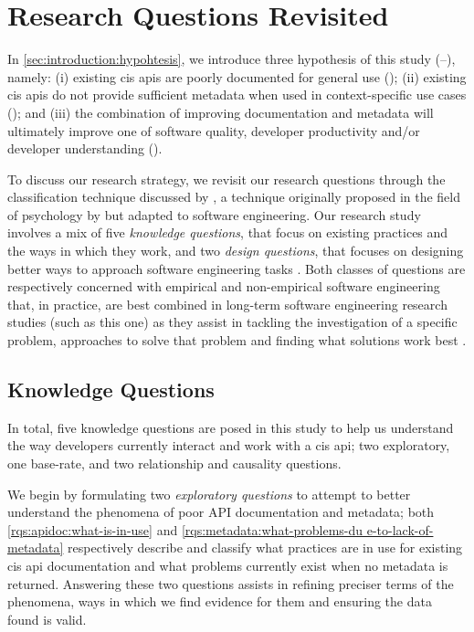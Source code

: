 \section{Research Questions Revisited}
\label{sec:research-methodology:research-questions}

In \cref{sec:introduction:hypohtesis}, we introduce three hypothesis of this study (--), namely: (i) existing \gls{cis} \glspl{api} are poorly documented for general use (); (ii) existing \gls{cis} \glspl{api} do not provide sufficient metadata when used in context-specific use cases (); and (iii) the combination of improving documentation and metadata will ultimately improve one of software quality, developer productivity and/or developer understanding ().

To discuss our research strategy, we revisit our research questions through the classification technique discussed by \citet{Easterbrook:2007ws}, a technique originally proposed in the field of psychology by \citet{Meltzoff:1998wg} but adapted to software engineering. Our research study involves a mix of five \textit{knowledge questions}, that focus on existing practices and the ways in which they work, and two \textit{design questions}, that focuses on designing better ways to approach software engineering tasks \citep{Simon:1996uw}. Both classes of questions are respectively concerned with empirical and non-empirical software engineering that, in practice, are best combined in long-term software engineering research studies (such as this one) as they assist in tackling the investigation of a specific problem, approaches to solve that problem and finding what solutions work best \citep{Wieringa:2006vd}.

\subsection{Knowledge Questions}
\label{ssec:research-methodology:research-questions:knowledge-questions}

In total, five knowledge questions are posed in this study to help us understand the way developers currently interact and work with a \gls{cis} \gls{api}; two exploratory, one base-rate, and two relationship and causality questions.

We begin by formulating two \textit{exploratory questions} to attempt to better understand the phenomena of poor API documentation and metadata; both \ref{rqs:apidoc:what-is-in-use} and \ref{rqs:metadata:what-problems-du                                                                e-to-lack-of-metadata} respectively describe and classify what practices are in use for existing \gls{cis} \gls{api} documentation and what problems currently exist when no metadata is returned. Answering these two questions assists in refining preciser terms of the phenomena, ways in which we find evidence for them and ensuring the data found is valid.

